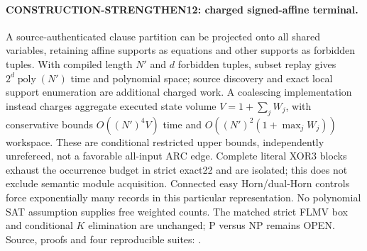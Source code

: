 \paragraph{CONSTRUCTION-STRENGTHEN12: charged signed-affine terminal.}
A source-authenticated clause partition can be projected onto all shared
variables, retaining affine supports as equations and other supports as
forbidden tuples. With compiled length $N'$ and $d$ forbidden tuples,
subset replay gives $2^d\operatorname{poly}(N')$ time and polynomial space;
source discovery and exact local support enumeration are additional charged
work. A coalescing implementation instead charges aggregate executed state
volume $V=1+\sum_j W_j$, with conservative bounds
$O((N')^4V)$ time and $O((N')^2(1+\max_jW_j))$ workspace.
These are conditional restricted upper bounds, independently unrefereed,
not a favorable all-input ARC edge. Complete literal XOR3 blocks exhaust
the occurrence budget in strict exact22 and are isolated; this does not
exclude semantic module acquisition. Connected easy Horn/dual-Horn controls
force exponentially many records in this particular representation.
No polynomial SAT assumption supplies free weighted counts.
The matched strict FLMV box and conditional $K$ elimination are unchanged;
P versus NP remains OPEN. Source, proofs and four reproducible suites:
.

